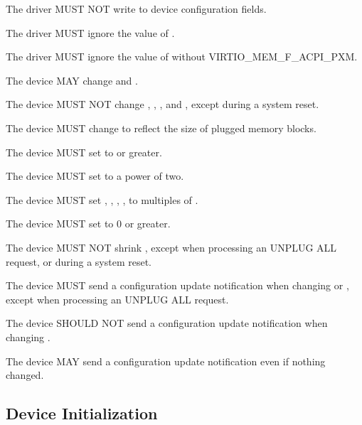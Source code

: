 
The driver MUST NOT write to device configuration fields.

The driver MUST ignore the value of .

The driver MUST ignore the value of  without
VIRTIO_MEM_F_ACPI_PXM.


The device MAY change  and
.

The device MUST NOT change , ,
, and , except during a system reset.

The device MUST change  to reflect the size of plugged
memory blocks.

The device MUST set  to  or
greater.

The device MUST set  to a power of two.

The device MUST set , ,
, ,  to
multiples of .

The device MUST set  to 0 or greater.

The device MUST NOT shrink , except when
processing an UNPLUG ALL request, or during a system reset.

The device MUST send a configuration update notification when changing
 or , except when
processing an UNPLUG ALL request.

The device SHOULD NOT send a configuration update notification when
changing .

The device MAY send a configuration update notification even if nothing
changed.

\subsection{Device Initialization}\label{Device Types / Memory Device / Device Initialization}

